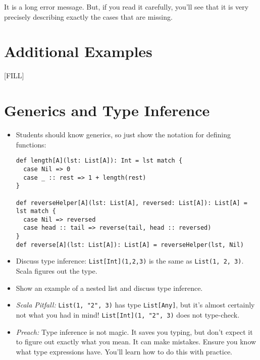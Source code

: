 \documentclass{book}
\begin{document}
It is a long error message. But, if you read it carefully, you'll see that it is
very precisely describing exactly the cases that are missing.

\section{Additional Examples}

[FILL]



\newlecture

\section{Generics and Type Inference}

\begin{itemize}

\item Students should know generics, so just show the notation for defining
functions:
%
\begin{verbatim}
def length[A](lst: List[A]): Int = lst match {
  case Nil => 0
  case _ :: rest => 1 + length(rest)
}

def reverseHelper[A](lst: List[A], reversed: List[A]): List[A] = lst match {
  case Nil => reversed
  case head :: tail => reverse(tail, head :: reversed)
}
def reverse[A](lst: List[A]): List[A] = reverseHelper(lst, Nil)
\end{verbatim}


\item Discuss type inference: \verb|List[Int](1,2,3)| is the same as
\verb|List(1, 2, 3)|. Scala figures out the type.

\item Show an example of a nested list and discuss type inference.

\item \emph{Scala Pitfall:} \verb|List(1, "2", 3)| has type \verb|List[Any]|,
but it's almost certainly not what you had in mind!
\verb|List[Int](1, "2", 3)| does not type-check.

\item \emph{Preach:} Type inference is not magic. It saves you typing, but
don't expect it to figure out exactly what you mean. It can make mistakes.
Ensure you know what type expressions have. You'll learn how to do this
with practice.

\end{itemize}
\end{document}
